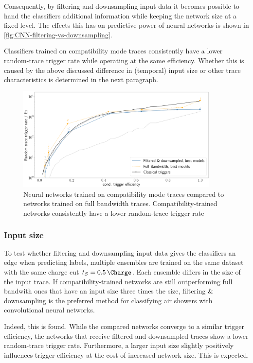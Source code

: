 Consequently, by filtering and downsampling input data it becomes possible to hand the classifiers additional information while keeping the network size at a fixed
level. The effects this has on predictive power of neural networks is shown in \autoref{fig:CNN-filtering-vs-downsampling}.

Classifiers trained on compatibility mode traces consistently have a lower random-trace trigger rate while operating at the same efficiency. Whether this is caused
by the above discussed difference in (temporal) input size or other trace characteristics is determined in the next paragraph.

\begin{figure}
	\centering
	\includegraphics[width=0.9\textwidth]{./plots/full_bandwidth_vs_filtering.png}
	\caption{Neural networks trained on compatibility mode traces compared to networks trained on full bandwidth traces. Compatibility-trained networks 
	consistently have a lower random-trace trigger rate}
	\label{fig:CNN-filtering-vs-downsampling}
\end{figure}

\subsubsection{Input size}
\label{sssec:input-size}

To test whether filtering and downsampling input data gives the classifiers an edge when predicting labels, multiple ensembles are trained on the same dataset with 
the same charge cut $t_S = \SI{0.5}{\Charge}$. Each ensemble differs in the size of the input trace. If compatibility-trained networks are still outperforming full 
bandwith ones that have an input size three times the size, filtering \& downsampling is the preferred method for classifying air showers with convolutional neural
networks.

Indeed, this is found. While the compared networks converge to a similar trigger efficiency, the networks that receive filtered and downsampled traces show a lower 
random-trace trigger rate. Furthermore, a larger input size slightly positively influences trigger efficiency at the cost of increased network size. This is 
expected.

